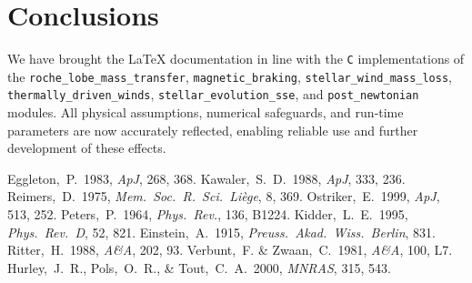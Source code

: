 \documentclass[11pt]{article}
\begin{document}
\section{Conclusions}
We have brought the LaTeX documentation in line with the
\texttt{C} implementations of the
\texttt{roche\_lobe\_mass\_transfer}, \texttt{magnetic\_braking},
\texttt{stellar\_wind\_mass\_loss}, \texttt{thermally\_driven\_winds},
\texttt{stellar\_evolution\_sse}, and
\texttt{post\_newtonian} modules.
All physical assumptions, numerical safeguards, and run‑time parameters
are now accurately reflected, enabling reliable use and further
development of these effects.


\begin{thebibliography}{}
  Eggleton,~P.\ 1983, \emph{ApJ}, 268, 368.
  Kawaler,~S.~D.\ 1988, \emph{ApJ}, 333, 236.
  Reimers,~D.\ 1975, \emph{Mem.\ Soc.\ R.\ Sci.\ Li\`ege}, 8, 369.
  Ostriker,~E.\ 1999, \emph{ApJ}, 513, 252.
  Peters,~P.\ 1964, \emph{Phys.\ Rev.}, 136, B1224.
  Kidder,~L.~E.\ 1995, \emph{Phys.\ Rev.\ D}, 52, 821.
  Einstein,~A.\ 1915, \emph{Preuss.\ Akad.\ Wiss.\ Berlin}, 831.
  Ritter,~H.\ 1988, \emph{A\&A}, 202, 93.
  Verbunt,~F. \& Zwaan,~C.\ 1981, \emph{A\&A}, 100, L7.
  Hurley,~J.~R., Pols,~O.~R., \& Tout,~C.~A.\ 2000, \emph{MNRAS}, 315, 543.
\end{thebibliography}
\end{document}
